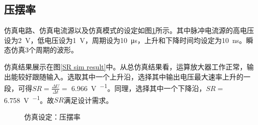 \documentclass[UTF8]{ctexart}
\numberwithin{figure}{subsection}
\numberwithin{table}{subsection}
\numberwithin{equation}{subsection}
\begin{document}
\subsection{压摆率}
仿真电路、仿真电流源以及仿真模式的设定如图\ref{SR sim settings}所示。其中脉冲电流源的高电压设为\SI[]{2}{\volt}，低电压设为\SI[]{1}{\volt}，周期设为\SI[]{10}{\micro\second}，上升和下降时间均设定为\SI[]{10}{\nano\second}。瞬态仿真3个周期的波形。

仿真结果展示在图\ref{SR sim result}中。从总仿真结果看，运算放大器工作正常，输出能较好跟随输入。选取其中一个上升沿，选择其中输出电压最大速率上升的一段，可得\(SR = \frac{\Delta U}{\Delta t} = \) \SI[]{6.966}{\volt\per{\micro\second}}。同理，选择其中一个下降沿，\(SR = \) \SI[]{6.758}{\volt\per{\micro\second}}。故\(SR\)满足设计需求。

\begin{figure}[H]
    \centering
    \caption{仿真设定：压摆率}
    \label{SR sim settings}
\end{figure}
\end{document}
